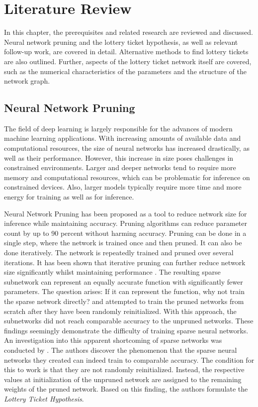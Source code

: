 \chapter{Literature Review}\label{literature_review}
In this chapter, the prerequisites and related research are reviewed and discussed.
Neural network pruning and the lottery ticket hypothesis, as well as relevant follow-up work, are covered in detail.
Alternative methods to find lottery tickets are also outlined.
Further, aspects of the lottery ticket network itself are covered, such as the numerical characteristics of the parameters and the structure of the network graph.

\section{Neural Network Pruning}
The field of deep learning is largely responsible for the advances of modern machine learning applications.
With increasing amounts of available data and computational resources, the size of neural networks has increased drastically, as well as their performance.
However, this increase in size poses challenges in constrained environments.
Larger and deeper networks tend to require more memory and computational resources, which can be problematic for inference on constrained devices.
Also, larger models typically require more time and more energy for training as well as for inference.

Neural Network Pruning \autocite{LeCun, OptimalBrainSurgeon, HanEtAl15, PruningFiltersForEfficientConvets} has been proposed as a tool to reduce network size for inference while maintaining accuracy.
Pruning algorithms can reduce parameter count by up to 90 percent without harming accuracy.
\autocite{LeCun, OptimalBrainSurgeon, HanEtAl15, PruningFiltersForEfficientConvets}
Pruning can be done in a single step, where the network is trained once and then pruned.
It can also be done iteratively. 
The network is repeatedly trained and pruned over several iterations. 
It has been shown that iterative pruning can further reduce network size significantly whilst maintaining performance \autocite{HanEtAl15}.
The resulting sparse subnetwork can represent an equally accurate function with significantly fewer parameters. 
The question arises: If it can represent the function, why not train the sparse network directly?
\textcite{PruningFiltersForEfficientConvets} and \textcite{HanEtAl15} attempted to train the pruned networks from scratch after they have been randomly reinitialized.
With this approach, the subnetworks did not reach comparable accuracy to the unpruned networks.
These findings seemingly demonstrate the difficulty of training sparse neural networks.
An investigation into this apparent shortcoming of sparse networks was conducted by \textcite{LTH}.
The authors discover the phenomenon that the sparse neural networks they created can indeed train to comparable accuracy.
The condition for this to work is that they are not randomly reinitialized. 
Instead, the respective values at initialization of the unpruned network are assigned to the remaining weights of the pruned network. 
Based on this finding, the authors formulate the \textit{Lottery Ticket Hypothesis}.

